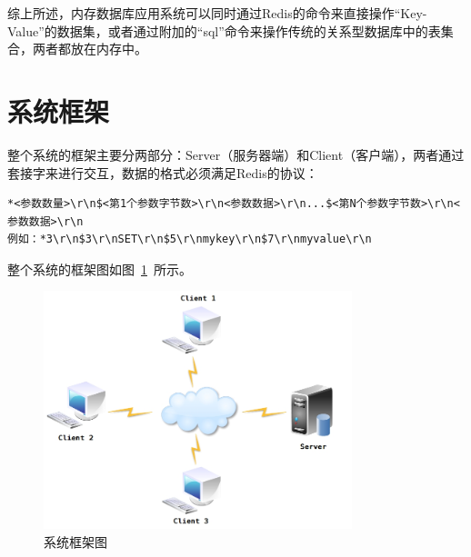 \documentclass{zjutthesis}
\begin{document}
综上所述，内存数据库应用系统可以同时通过Redis的命令来直接操作“Key-Value”的数据集，或者通过附加的“sql”命令来操作传统的关系型数据库中的表集合，两者都放在内存中。

\section{系统框架}
整个系统的框架主要分两部分：Server（服务器端）和Client（客户端），两者通过套接字来进行交互，数据的格式必须满足Redis的协议：
\begin{verbatim}
*<参数数量>\r\n$<第1个参数字节数>\r\n<参数数据>\r\n...$<第N个参数字节数>\r\n<参数数据>\r\n
例如：*3\r\n$3\r\nSET\r\n$5\r\nmykey\r\n$7\r\nmyvalue\r\n
\end{verbatim}

整个系统的框架图如图~\ref{fig:Network}~所示。
\begin{figure}[H]
\centering
\includegraphics[width=0.8\textwidth]{Network}
\caption{系统框架图}\label{fig:Network}
\vspace{\baselineskip} %
\end{figure}
\end{document}
